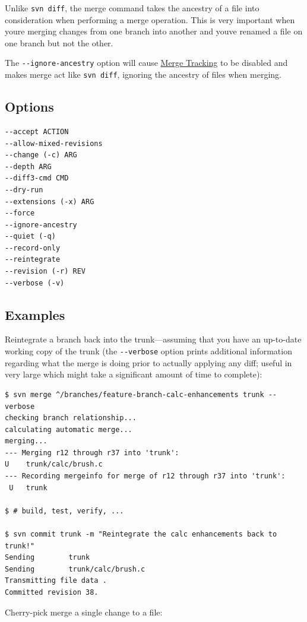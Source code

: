 Unlike \texttt{svn\ diff}, the merge command takes the ancestry of a
file into consideration when performing a merge operation. This is very
important when you\textquotesingle re merging changes from one branch
into another and you\textquotesingle ve renamed a file on one branch but
not the other.

The \texttt{-\/-ignore-ancestry} option will cause
\hyperref[svn.branchmerge.basicmerging.mergetracking]{Merge Tracking} to
be disabled and makes merge act like \texttt{svn\ diff}, ignoring the
ancestry of files when merging.

\subsection{Options}

\begin{verbatim}
--accept ACTION
--allow-mixed-revisions
--change (-c) ARG
--depth ARG
--diff3-cmd CMD
--dry-run
--extensions (-x) ARG
--force
--ignore-ancestry
--quiet (-q)
--record-only
--reintegrate
--revision (-r) REV
--verbose (-v)
\end{verbatim}

\subsection{Examples}

Reintegrate a branch back into the trunk---assuming that you have an
up-to-date working copy of the trunk (the \texttt{-\/-verbose} option
prints additional information regarding what the merge is doing prior to
actually applying any diff; useful in very large which might take a
significant amount of time to complete):

\begin{verbatim}
$ svn merge ^/branches/feature-branch-calc-enhancements trunk --verbose
checking branch relationship...
calculating automatic merge...
merging...
--- Merging r12 through r37 into 'trunk':
U    trunk/calc/brush.c
--- Recording mergeinfo for merge of r12 through r37 into 'trunk':
 U   trunk

$ # build, test, verify, ...

$ svn commit trunk -m "Reintegrate the calc enhancements back to trunk!"
Sending        trunk
Sending        trunk/calc/brush.c
Transmitting file data .
Committed revision 38.
\end{verbatim}

Cherry-pick merge a single change to a file:

